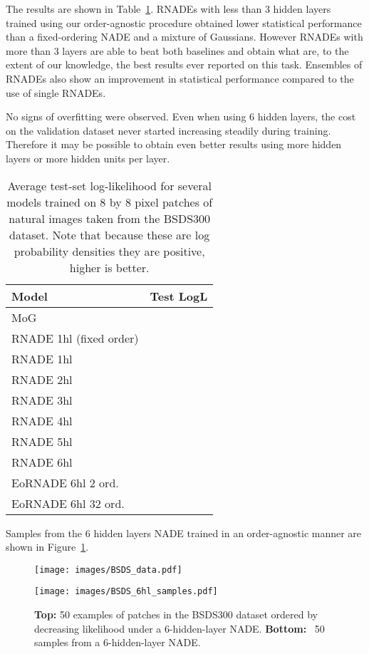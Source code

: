 \documentclass{article}
\begin{document}
The results are shown in Table~\ref{tab:BSDS-results}. RNADEs with less than 3
hidden layers trained using our order-agnostic procedure obtained lower statistical
performance than a fixed-ordering NADE and a mixture of Gaussians. However RNADEs
with more than 3 layers are able to beat both baselines and obtain what are, to
the extent of our knowledge, the best results ever reported on this task.
Ensembles of RNADEs also show an improvement in statistical performance compared
to the use of single RNADEs.

No signs of overfitting were observed. Even when using 6 hidden layers, the cost
on the validation dataset never started increasing steadily during training.
Therefore it may be possible to obtain even better results using more hidden layers or
more hidden units per layer.
\begin{table}
\vspace*{-0.2in}
\begin{center}
\caption{Average test-set log-likelihood for several models
trained on 8 by 8 pixel patches of natural images taken from the BSDS300
dataset. Note that because these are log probability densities they are positive,
higher is better.}
\label{tab:BSDS-results}
\medskip
\begin{tabular}{lc}
\toprule
{Model} & {Test LogL}\\
\midrule
MoG \ \cite{Zoran2012} &  \\
RNADE 1hl (fixed order) &  \\
\hline
RNADE 1hl &  \\
RNADE 2hl &  \\
RNADE 3hl &  \\
RNADE 4hl &  \\
RNADE 5hl & \\
RNADE 6hl &  \\
EoRNADE 6hl 2 ord.  &  \\
EoRNADE 6hl 32 ord. &  \\
\bottomrule
\end{tabular}
\end{center}
\vspace*{-0.3in}
\end{table}
Samples from the 6 hidden layers NADE trained in an order-agnostic manner are
shown in Figure~\ref{fig:natural-image-samples}.

\begin{figure}
\vspace*{-0.1in}
\centerline{\texttt{[image: images/BSDS\_data.pdf]}}
\centerline{\texttt{[image: images/BSDS\_6hl\_samples.pdf]}}
\caption{\textbf{Top:} 50 examples of  patches in the BSDS300
dataset ordered by decreasing likelihood under a 6-hidden-layer NADE\@. \textbf{Bottom:}~
50 samples from a 6-hidden-layer NADE\@.}
\label{fig:natural-image-samples}
\vspace*{-0.3in}
\end{figure}
\end{document}
